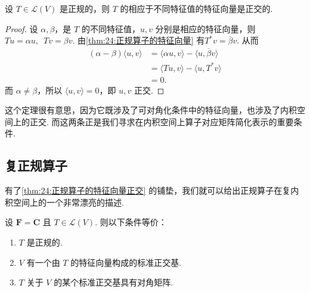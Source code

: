 \begin{theorem} \label{thm:24:正规算子的特征向量正交}
    设 $ T \in \mathcal{L}(V) $ 是正规的，则 $ T $ 的相应于不同特征值的特征向量是正交的.
\end{theorem}

\begin{proof}
    设 $ \alpha, \beta $，是 $ T $ 的不同特征值，$ u, v $ 分别是相应的特征向量，则 $ Tu = \alpha u,\enspace Tv = \beta v $. 由\autoref{thm:24:正规算子的特征向量} 有$ T^*v = \overline{\beta} v $. 从而
    \begin{align*}
        (\alpha - \beta)\langle u, v \rangle
         & = \langle \alpha u, v \rangle - \langle u, \overline{\beta}v \rangle \\
         & = \langle Tu, v \rangle - \langle u, T^*v \rangle                    \\
         & = 0.
    \end{align*}
    而 $ \alpha \neq \beta $，所以 $ \langle u, v \rangle = 0 $，即 $ u, v $ 正交.
\end{proof}

这个定理很有意思，因为它既涉及了可对角化条件中的特征向量，也涉及了内积空间上的正交. 而这两条正是我们寻求在内积空间上算子对应矩阵简化表示的重要条件.

\subsection{复正规算子}

有了\autoref{thm:24:正规算子的特征向量正交} 的铺垫，我们就可以给出正规算子在复内积空间上的一个非常漂亮的描述.

\begin{theorem}[复谱定理] \label{thm:24:复谱定理} 
    设 $ \mathbf{F} = \mathbf{C} $ 且 $ T \in \mathcal{L}(V) $. 则以下条件等价：
    \begin{enumerate}
        \item \label{item:24:复谱定理:1}
              $ T $ 是正规的.

        \item \label{item:24:复谱定理:2}
              $ V $ 有一个由 $ T $ 的特征向量构成的标准正交基.

        \item \label{item:24:复谱定理:3}
              $ T $ 关于 $ V $ 的某个标准正交基具有对角矩阵.
    \end{enumerate}
\end{theorem}


